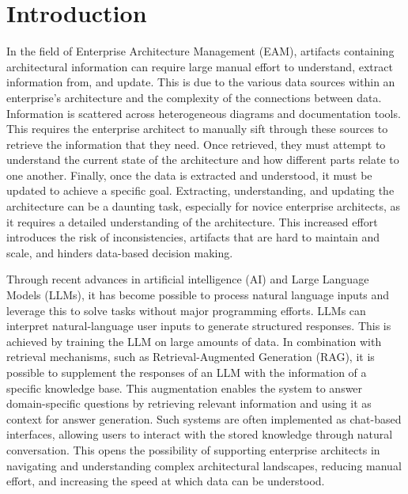 \chapter{Introduction}
\label{ch:intro}

In the field of  Enterprise Architecture Management (EAM), artifacts containing architectural information can require large manual effort to understand, extract information from, and update. This is due to the various data sources within an enterprise's architecture and the complexity of the connections between data. Information is scattered across heterogeneous diagrams and documentation tools. This requires the enterprise architect to manually sift through these sources to retrieve the information that they need. Once retrieved, they must attempt to understand the current state of the architecture and how different parts relate to one another. Finally, once the data is extracted and understood, it must be updated to achieve a specific goal. Extracting, understanding, and updating the architecture can be a daunting task, especially for novice enterprise architects, as it requires a detailed understanding of the architecture. This increased effort introduces the risk of inconsistencies, artifacts that are hard to maintain and scale, and hinders data-based decision making. \cite{jung2021masterclass}

Through recent advances in artificial intelligence (AI) and Large Language Models (LLMs), it has become possible to process natural language inputs and leverage this to solve tasks without major programming efforts. LLMs can interpret natural-language user inputs to generate structured responses. This is achieved by training the LLM on large amounts of data. \cite{singhal2023large, hadi2023large} In combination with retrieval mechanisms, such as Retrieval-Augmented Generation (RAG), it is possible to supplement the responses of an LLM with the information of a specific knowledge base. This augmentation enables the system to answer domain-specific questions by retrieving relevant information and using it as context for answer generation. \cite{zhao2026retrieval} Such systems are often implemented as chat-based interfaces, allowing users to interact with the stored knowledge through natural conversation. This opens the possibility of supporting enterprise architects in navigating and understanding complex architectural landscapes, reducing manual effort, and increasing the speed at which data can be understood.

